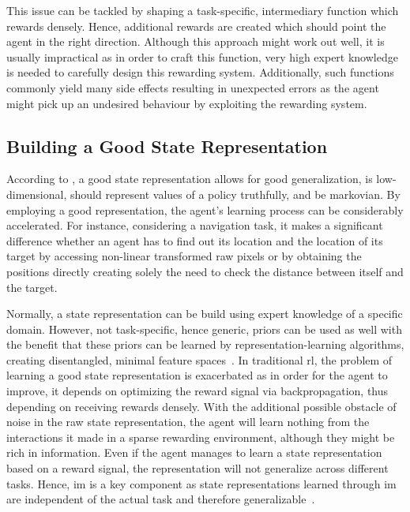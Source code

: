 \documentclass[draft,final]{vutinfth} %
\begin{document}
    This issue can be tackled by shaping a task-specific, intermediary function which rewards densely.
    Hence, additional rewards are created which should point the agent in the right direction.
    Although this approach might work out well, it is usually impractical as in order to craft this function, very high expert knowledge is needed to carefully design this rewarding system.
    Additionally, such functions commonly yield many side effects resulting in unexpected errors as the agent might pick up an undesired behaviour by exploiting the rewarding system.

    \subsection{Building a Good State Representation}\label{subsec:building-a-good-state-representation}

    According to \citeauthor{bohmer_autonomous_2015}, a good state representation allows for good generalization, is low-dimensional, should represent values of a policy truthfully, and be markovian.
    By employing a good representation, the agent's learning process can be considerably accelerated.
    For instance, considering a navigation task, it makes a significant difference whether an agent has to find out its location and the location of its target by accessing non-linear transformed raw pixels or by obtaining the positions directly creating solely the need to check the distance between itself and the target.

    Normally, a state representation can be build using expert knowledge of a specific domain.
    However, not task-specific, hence generic, priors can be used as well with the benefit that these priors can be learned by representation-learning algorithms, creating disentangled, minimal feature spaces~\cite{bengio_representation_2014}.
    In traditional \gls{rl}, the problem of learning a good state representation is exacerbated as in order for the agent to improve, it depends on optimizing the reward signal via backpropagation, thus depending on receiving rewards densely.
    With the additional possible obstacle of noise in the raw state representation, the agent will learn nothing from the interactions it made in a sparse rewarding environment, although they might be rich in information.
    Even if the agent manages to learn a state representation based on a reward signal, the representation will not generalize across different tasks.
    Hence, \gls{im} is a key component as state representations learned through \gls{im} are independent of the actual task and therefore generalizable~\citep{aubret_survey_2019}.
\end{document}
